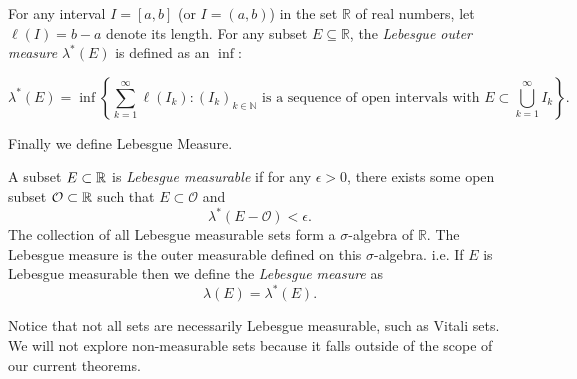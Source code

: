 \begin{definition}
    For any interval $I = [a,b]$ (or $I = (a, b)$) in the set $\mathbb{R}$ of real numbers, let $\ell(I)= b - a$ denote its length. For any subset $E\subseteq\mathbb{R}$, the \textit{Lebesgue outer measure} $\lambda^*(E)$ is defined as an $\inf:$ 
    
    $$\lambda^*(E) = \inf \left\{\sum_{k=1}^\infty \ell(I_k) : {(I_k)_{k \in \mathbb N}} \text{ is a sequence of open intervals with } E\subset \bigcup_{k=1}^\infty I_k\right\}.$$
\end{definition}

Finally we define Lebesgue Measure. 
\begin{definition}
    A subset $E\subset \mathbb{R}$ is \textit{Lebesgue measurable} if for any $\epsilon > 0$, there exists some open subset $\mathcal{O}\subset \mathbb{R}$ such that 
    $E\subset \mathcal{O}$ and 
    $$\lambda^*(E - \mathcal{O}) < \epsilon. $$
    The collection of all Lebesgue measurable sets form a $\sigma$-algebra of ${\mathbb R}$. The Lebesgue measure is the outer measurable defined on this $\sigma$-algebra. i.e.
    If $E$ is Lebesgue measurable then we define the \textit{Lebesgue measure} as 
    $$\lambda(E) = \lambda^*(E).$$
\end{definition}

Notice that not all sets are necessarily Lebesgue measurable, such as Vitali sets.  We will not explore non-measurable sets because it falls outside of the scope of our current theorems.



